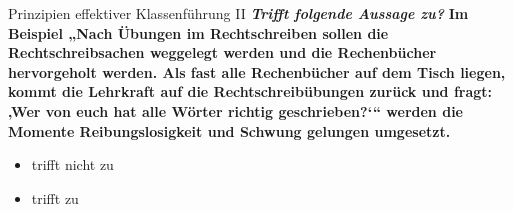 \documentclass[a4paper]{article}
\newcommand{\TheCorrectAnswer}{\rlap{\hspace{1.4pt}$\bullet$}{$\ocircle$}}
\newcommand{\TheWrongAnswer}{$\ocircle$}
\newcommand{\defaultCorrect}{\ding{51}}
\newcommand{\defaultWrong}{\ding{55}}
\newcommand{\defaultUnsure}{\textbf{?}}
\newenvironment{answers}{\begin{itemize}}{\end{itemize}}
\newcommand{\correct}{\defaultCorrect}
\newcommand{\wrong}{\defaultWrong}
\newcommand{\unsure}{\defaultUnsure}
\newenvironment{question}[2]{%
    \section[#1 \normalfont(#2)]{#1\\\small\normalfont\hyperlink{tableofcontents}{zurück zum Inhaltsverzeichnis}}%
}{%
    \newpage%
}
\newcommand{\questiontext}[1]{\textbf{#1}}
\newcommand{\assignment}[1]{\textbf{\textit{#1}}\newline}
\newenvironment{single-choice}[1]{%
    \begin{question}{#1}{Single Choice}%
    \renewenvironment{answers}{%
        \begin{single-choice-list}}{\end{single-choice-list}%
    }%
    \renewcommand{\correct}{\TheCorrectAnswer}%
    \renewcommand{\wrong}{\TheWrongAnswer}%
    \renewcommand{\unsure}{TheUnsureAnswer}%
}{%
    \renewcommand{\correct}{\defaultCorrect}%
    \renewcommand{\wrong}{\defaultWrong}%
    \renewcommand{\unsure}{\defaultUnsure}%
    \end{question}%
}
\begin{document}
\begin{single-choice}{Prinzipien effektiver Klassenführung II}
    \assignment{Trifft folgende Aussage zu?}
    \questiontext{Im Beispiel „Nach Übungen im Rechtschreiben sollen die Rechtschreibsachen weggelegt werden und die Rechenbücher hervorgeholt werden. Als fast alle Rechenbücher auf dem Tisch liegen, kommt die Lehrkraft auf die Rechtschreibübungen zurück und fragt: ‚Wer von euch hat alle Wörter richtig geschrieben?\relax‘“ werden die Momente Reibungslosigkeit und Schwung gelungen umgesetzt.}
    \begin{answers}
        \item[\correct] trifft nicht zu
        \item[\wrong] trifft zu
    \end{answers}
\end{single-choice}
\end{document}
